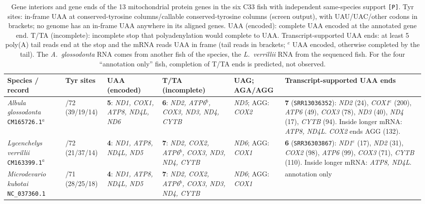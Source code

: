 \documentclass[11pt, a4paper]{article}
\begin{document}
\begin{table}[htbp]
\centering
\scriptsize
\setlength{\tabcolsep}{3pt}
\renewcommand{\arraystretch}{1.25}
\caption{Gene interiors and gene ends of the 13 mitochondrial protein genes in the six C33 fish with independent same-species support \texttt{[P]}. Tyr sites: in-frame UAA at conserved-tyrosine columns/callable conserved-tyrosine columns (screen output), with UAU/UAC/other codons in brackets; no genome has an in-frame UAA anywhere in its aligned genes. UAA (encoded): complete UAA encoded at the annotated gene end. T/TA (incomplete): incomplete stop that polyadenylation would complete to UAA. Transcript-supported UAA ends: at least 5 poly(A) tail reads end at the stop and the mRNA reads UAA in frame (tail reads in brackets; $^{e}$ UAA encoded, otherwise completed by the tail). The \textit{A.\ glossodonta} RNA comes from another fish of the species, the \textit{L.\ verrillii} RNA from the sequenced fish. For the four ``annotation only'' fish, completion of T/TA ends is predicted, not observed.}\label{tab:sixfish}
\begin{tabular}{
  >{\raggedright\arraybackslash}p{2.55cm}
  >{\raggedright\arraybackslash}p{1.45cm}
  >{\raggedright\arraybackslash}p{2.35cm}
  >{\raggedright\arraybackslash}p{2.75cm}
  >{\raggedright\arraybackslash}p{1.75cm}
  >{\raggedright\arraybackslash}p{3.8cm}
}
\toprule
\textbf{Species / record} & \textbf{Tyr sites} & \textbf{UAA (encoded)} & \textbf{T/TA (incomplete)} & \textbf{UAG; AGA/AGG} & \textbf{Transcript-supported UAA ends} \\
\midrule
\textit{Albula glossodonta} \texttt{CM165726.1}$^{a}$ & 0/72 (39/19/14) & \textbf{5}: \textit{ND1, COX1, ATP8, ND4L, ND6} & \textbf{6}: \textit{ND2, ATP6$^{b}$, COX3, ND3, ND4, CYTB} & \textit{ND5}; AGG: \textit{COX2} & \textbf{7} (\texttt{SRR13036352}): \textit{ND2} (24), \textit{COX1}$^{e}$ (200), \textit{ATP6} (49), \textit{COX3} (78), \textit{ND3} (40), \textit{ND4} (17), \textit{CYTB} (94). Inside longer mRNA: \textit{ATP8, ND4L}. \textit{COX2} ends AGG (132). \\
\textit{Lycenchelys verrillii} \texttt{CM163399.1}$^{a}$ & 0/72 (21/37/14) & \textbf{4}: \textit{ND1, ATP8, ND4L, ND5} & \textbf{7}: \textit{ND2, COX2, ATP6$^{b}$, COX3, ND3, ND4, CYTB} & \textit{ND6}; AGG: \textit{COX1} & \textbf{6} (\texttt{SRR36303867}): \textit{ND1}$^{e}$ (17), \textit{ND2} (31), \textit{COX2} (98), \textit{ATP6} (99), \textit{COX3} (71), \textit{CYTB} (110). Inside longer mRNA: \textit{ATP8, ND4L}. \\
\textit{Microdevario kubotai} \texttt{NC\_037360.1} & 0/71 (28/25/18) & \textbf{4}: \textit{ND1, ATP8, ND4L, ND5} & \textbf{7}: \textit{ND2, COX2, ATP6$^{b}$, COX3, ND3, ND4, CYTB} & \textit{ND6}; AGG: \textit{COX1} & annotation only \\

\end{tabular}
\end{table}
\end{document}
